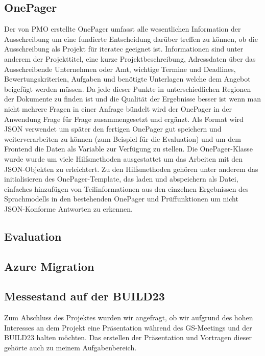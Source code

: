 \subsection{OnePager}
Der von PMO erstellte OnePager umfasst alle wesentlichen Information der Ausschreibung um eine fundierte Entscheidung darüber treffen zu 
können, ob die Ausschreibung als Projekt für iteratec geeignet ist. Informationen sind unter anderem der Projekttitel, eine kurze Projektbeschreibung, 
Adressdaten über das Ausschreibende Unternehmen oder Amt, wichtige Termine und Deadlines, Bewertungskriterien, Aufgaben und benötigte Unterlagen welche 
dem Angebot beigefügt werden müssen. Da jede dieser Punkte in unterschiedlichen Regionen der Dokumente zu finden ist und die Qualität der Ergebnisse 
besser ist wenn man nicht mehrere Fragen in einer Anfrage bündelt wird der OnePager in der Anwendung Frage für Frage zusammengesetzt und ergänzt.
Als Format wird JSON verwendet um später den fertigen OnePager gut speichern und weiterverarbeiten zu können (zum Beispiel für die Evaluation) und um dem
Frontend die Daten als Variable zur Verfügung zu stellen. Die OnePager-Klasse wurde wurde um viele Hilfsmethoden ausgestattet um das Arbeiten mit den 
JSON-Objekten zu erleichtert. Zu den Hilfsmethoden gehören unter anderem das initialisieren des OnePager-Template, das laden und abspeichern als Datei, 
einfaches hinzufügen von Teilinformationen aus den einzelnen Ergebnissen des Sprachmodells in den bestehenden OnePager und Prüffunktionen um nicht 
JSON-Konforme Antworten zu erkennen. 

\subsection{Evaluation}
\label{chap:Evaluation}

\subsection{Azure Migration}

\subsection{Messestand auf der BUILD23}

Zum Abschluss des Projektes wurden wir angefragt, ob wir 
aufgrund des hohen Interesses an dem Projekt eine Präsentation während des GS-Meetings und der BUILD23 halten möchten. 
Das erstellen der Präsentation und Vortragen dieser gehörte auch zu meinem Aufgabenbereich.

